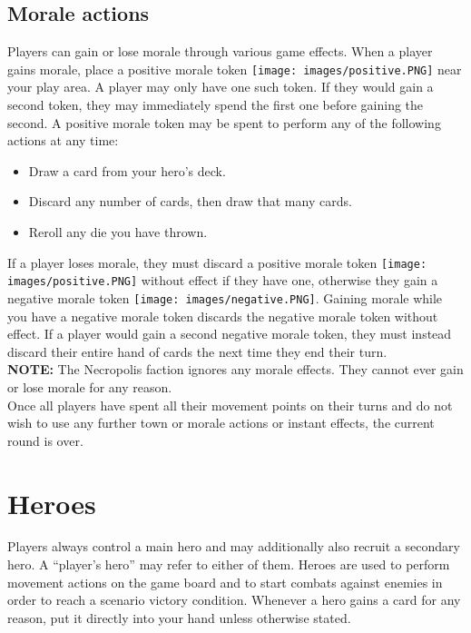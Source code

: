 \documentclass[12pt]{article}
\begin{document}
\subsection*{Morale actions}
Players can gain or lose morale through various game effects. When a player gains morale, place a positive morale token \texttt{[image: images/positive.PNG]} near your play area. A player may only have one such token. If they would gain a second token, they may immediately spend the first one before gaining the second. A positive morale token may be spent to perform any of the following actions at any time:
\begin{itemize}
\item Draw a card from your hero's deck.
\item Discard any number of cards, then draw that many cards.
\item Reroll any die you have thrown.
\end{itemize}
If a player loses morale, they must discard a positive morale token \texttt{[image: images/positive.PNG]} without effect if they have one, otherwise they gain a negative morale token \texttt{[image: images/negative.PNG]}. Gaining morale while you have a negative morale token discards the negative morale token without effect. If a player would gain a second negative morale token, they must instead discard their entire hand of cards the next time they end their turn.\\[6pt]
\textbf{NOTE:} The Necropolis faction ignores any morale effects. They cannot ever gain or lose morale for any reason.\\[12pt]
Once all players have spent all their movement points on their turns and do not wish to use any further town or morale actions or instant effects, the current round is over.\\[6pt]

\clearpage

\section[Heroes]{Heroes\hypertarget{Heroes}{}}
Players always control a main hero and may additionally also recruit a secondary hero. A “player’s hero” may refer to either of them. Heroes are used to perform movement actions on the game board and to start combats against enemies in order to reach a scenario victory condition. Whenever a hero gains a card for any reason, put it directly into your hand unless otherwise stated. 
\end{document}
